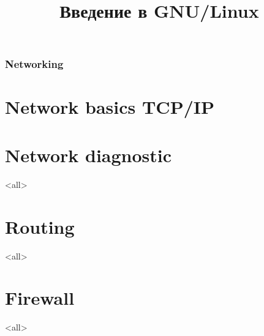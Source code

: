 

\title{Введение в GNU/Linux}




\begin{frame}
	\frametitle{Networking}
	\titlepage
	\vspace{-0.5cm}
	\begin{center}
	\end{center}
\end{frame}


\begin{frame}
	\tableofcontents
	[hideallsubsections]
\end{frame}


\section{Network basics TCP/IP}
\section{Network diagnostic}
\mode<all>{}
\section{Routing}
\mode<all>{}
\section{Firewall}
\mode<all>{}



